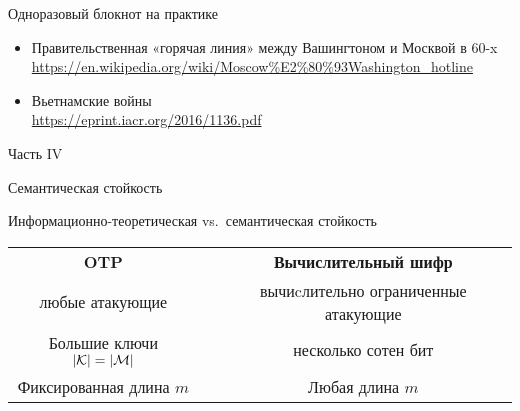 \documentclass[usenames,dvipsnames,8pt,aspectratio=169]{beamer}
\begin{document}
\begin{frame}{Одноразовый блокнот на практике}
\Large
\begin{itemize}
\itemsep 12pt
\item Правительственная «горячая линия» между Вашингтоном и Москвой в 60-x\\[4pt]
\url{https://en.wikipedia.org/wiki/Moscow\%E2\%80\%93Washington_hotline}

\item Вьетнамские войны\\[4pt]
\url{https://eprint.iacr.org/2016/1136.pdf}
\end{itemize}

\end{frame}

\begin{frame}
Часть IV \\ [10pt]
\begin{LARGE}
	
	\color{Orange}
	\Huge Семантическая стойкость
	
\end{LARGE}
\end{frame}

\begin{frame}{Информационно-теоретическая vs.\ семантическая стойкость}
\LARGE

\begin{table}
	
	\begin{tabular}{c p{0.6cm} c}
		\textbf{\color{Orange}OTP}  &  & \textbf{\color{Orange} Вычислительный шифр} \\[10pt]
		
		{\color{Orange}любые } атакующие &  &  {\color{Orange}вычиcлительно ограниченные } атакующие \\[10pt]
		
		Большие ключи $|\mathcal{K}| = |\mathcal{M}|$ &  & несколько сотен бит \\[10pt]
		
		Фиксированная длина $m$  &  &Любая длина $m$
		
	\end{tabular}
\end{table}

\end{frame}
\end{document}
